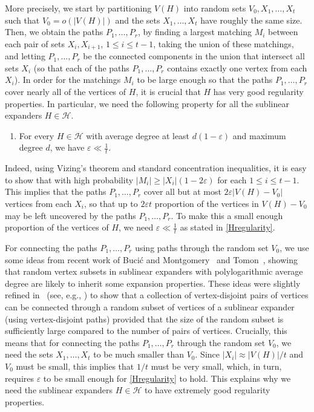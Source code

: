 \documentclass[10pt]{article}
\theoremstyle{plain}
\numberwithin{theorem}{section}
\theoremstyle{definition}
\theoremstyle{remark}
\newcommand{\cH}{\mathcal{H}}
\renewcommand{\setminus}{-}
\newcommand{\eps}{\varepsilon}
\theoremstyle{plain}
\begin{document}
More precisely, we start by partitioning $V(H)$ into random sets $V_0, X_1, \ldots, X_t$ such that $V_0 = o(|V(H)|)$ and the sets $X_1, \ldots, X_t$ have roughly the same size. Then, we obtain the paths $P_1, \ldots, P_r$, by finding a largest matching $M_i$ between each pair of sets $X_i, X_{i+1}$, $1 \le i \le t-1$, taking the union of these matchings, and letting $P_1, \ldots, P_r$ be the connected components in the union that intersect all sets $X_i$ (so that each of the paths $P_1, \ldots, P_r$ contains exactly one vertex from each $X_i$).
In order for the matchings $M_i$ to be large enough so that the paths $P_1, \ldots, P_r$ cover nearly all of the vertices of $H$, it is crucial that $H$ has very good regularity properties. In particular, we need the following property for all the sublinear expanders $H \in \cH$. 

\begin{enumerate}[label = $\mathbf{(P)}$]
    \item \label{Hregularity} 
		For every $H \in \cH$ with average degree at least $d (1 - \eps)$ and maximum degree $d$, we have $\eps \ll \frac{1}{t}$.
\end{enumerate}

Indeed, using Vizing's theorem and standard concentration inequalities, it is easy to show that with high probability $|M_i| \ge |X_i|(1-2\eps)$ for each $1 \le i \le t-1$. This implies that the paths $P_1, \ldots, P_r$ cover all but at most $2\eps |V(H) \setminus V_0|$ vertices from each $X_i$, so that up to $2\eps t$ proportion of the vertices in $V(H) \setminus V_0$ may be left uncovered by the paths $P_1, \ldots, P_r$. To make this a small enough proportion of the vertices of $H$, we need $\eps \ll \frac{1}{t}$ as stated in \ref{Hregularity}. 

For connecting the paths $P_1, \ldots, P_r$ using paths through the random set $V_0$, we use some ideas from recent work of Buci\'c and Montgomery~\cite{bucic2022erdos} and Tomon~\cite{tomon2024robust}, showing that random vertex subsets in sublinear expanders with polylogarithmic average degree are likely to inherit some expansion properties. These ideas were slightly refined in~\cite{chakraborti2024edge} (see, e.g., \cite[Lemma 8]{chakraborti2024edge}) to show that a collection of vertex-disjoint pairs of vertices can be connected through a random subset of vertices of a sublinear expander (using vertex-disjoint paths) provided that the size of the random subset is sufficiently large compared to the number of pairs of vertices. Crucially, this means that for connecting the paths $P_1, \ldots, P_r$ through the random set $V_0$, we need the sets $X_1, \ldots, X_t$ to be much smaller than $V_0$. Since $|X_i| \approx |V(H)|/t$ and $V_0$ must be small, this implies that $1/t$ must be very small, which, in turn, requires $\eps$ to be small enough for \ref{Hregularity} to hold. This explains why we need the sublinear expanders $H \in \cH$ to have extremely good regularity properties. 
\end{document}
